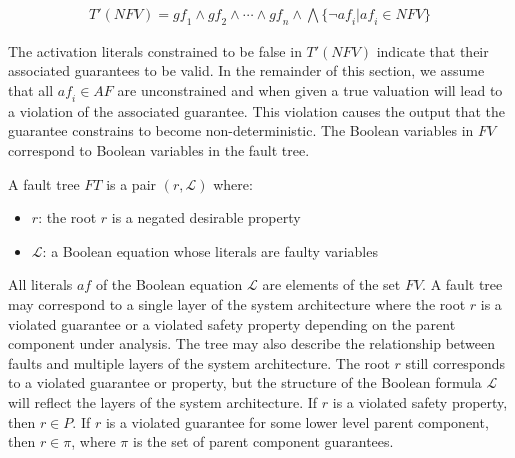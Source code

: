 \begin{gather*}
T'(\mathit{NFV}) = \mathit{gf_1} \land \mathit{gf_2} \land \cdots \land \mathit{gf_n} \land \bigwedge \{\neg \mathit{af_i} | \mathit{af_i} \in \mathit{NFV} \}
\end{gather*}

The activation literals constrained to be false in $T'(\mathit{NFV})$ indicate that their associated guarantees to be valid. In the remainder of this section, we assume that all $\mathit{af_i} \in \mathit{AF}$ are unconstrained and when given a true valuation will lead to a violation of the associated guarantee. This violation causes the output that the guarantee constrains to become non-deterministic. The Boolean variables in $\mathit{FV}$ correspond to Boolean variables in the fault tree. 



\begin{definition}
A fault tree $\mathit{FT}$ is a pair $(r, \mathcal{L})$ where:
\begin{itemize}
\item[] $r$: the root $r$ is a negated desirable property
\item[] $\mathcal{L}$: a Boolean equation whose literals are faulty variables
\end{itemize}
\end{definition}

All literals $\mathit{af}$ of the Boolean equation $\mathcal{L}$ are elements of the set $\mathit{FV}$. A fault tree may correspond to a single layer of the system architecture where the root $r$ is a violated guarantee or a violated safety property depending on the parent component under analysis. The tree may also describe the relationship between faults and multiple layers of the system architecture. The root $r$ still corresponds to a violated guarantee or property, but the structure of the Boolean formula $\mathcal{L}$ will reflect the layers of the system architecture. If $r$ is a violated safety property, then $r \in P$. If $r$ is a violated guarantee for some lower level parent component, then $r \in \pi$, where $\pi$ is the set of parent component guarantees. 

